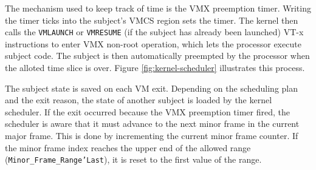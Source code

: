 The mechanism used to keep track of time is the VMX preemption timer. Writing
the timer ticks into the subject's VMCS region sets the timer. The kernel then
calls the \texttt{VMLAUNCH} or \texttt{VMRESUME} (if the subject has already
been launched) VT-x instructions to enter VMX non-root operation, which lets the
processor execute subject code.  The subject is then automatically preempted by
the processor when the alloted time slice is over. Figure
\ref{fig:kernel-scheduler} illustrates this process.

The subject state is saved on each VM exit. Depending on the scheduling plan and
the exit reason, the state of another subject is loaded by the kernel scheduler.
If the exit occurred because the VMX preemption timer fired, the scheduler is
aware that it must advance to the next minor frame in the current major frame.
This is done by incrementing the current minor frame counter. If the minor frame
index reaches the upper end of the allowed range
(\texttt{Minor\_Frame\_Range'Last}), it is reset to the first value of the
range.
